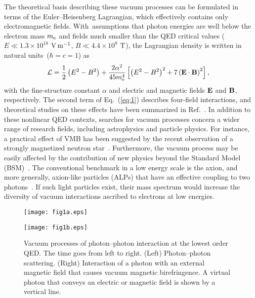 \documentclass[10pt,a4paper]{article}%
\begin{document}
The theoretical basis describing these vacuum processes can be formulated in terms of the Euler--Heisenberg Lagrangian, which effectively contains only electromagnetic fields.
With~assumptions that photon energies are well below the electron mass $m_{{\rm e}}$ and fields much smaller than the QED critical values ($E \ll 1.3 \times 10^{18}$ ${\rm V\, m^{-1}}$, $B \ll 4.4 \times 10^{9}$ ${\rm T}$), the Lagrangian density is written in natural units~($\hbar = c = 1$) as~\cite{eh}
\begin{equation}
\mathcal{L} = \frac{1}{2} \left( E^{2} - B^{2} \right) + \frac{2\alpha^{2}}{45m_{\rm{e}}^{4}} \left[ \left( E^{2} - B^{2} \right) ^{2} + 7 \left( \bf{E \cdot B} \right) ^{2} \right],
\label{eq:1}
\end{equation}
with the fine-structure constant $\alpha$ and electric and magnetic fields $\bf{E}$ and $\bf{B}$, respectively.
The second term of Eq.~(\ref{eq:1}) describes four-field interactions, and theoretical studies on these effects have been summarized in Ref.~\cite{review1, review2}.
In addition to these nonlinear QED contexts, searches for vacuum processes concern a wider range of research fields, including astrophysics and particle physics.
For instance, a practical effect of VMB has been suggested by the recent observation of a strongly magnetized neutron star~\cite{neutron_star1, neutron_star2, neutron_star3}.
Furthermore, the vacuum process may be easily affected by the contribution of new physics beyond the Standard Model (BSM)~\cite{snow_mass}.
The conventional benchmark in a low energy scale is the axion, and more generally, axion-like particles (ALPs) that have an effective coupling to two photons~\cite{axion_review}.
If such light particles exist, their mass spectrum would increase the diversity of vacuum interactions ascribed to electrons at low energies.

\begin{figure}[!t]
\begin{minipage}{0.5\hsize}
\centering
\texttt{[image: fig1a.eps]}
\end{minipage}
\begin{minipage}{0.5\hsize}
\centering
\texttt{[image: fig1b.eps]}
\end{minipage}
\caption{
Vacuum processes of photon--photon interaction at the lowest order QED.
The time goes from left to right.
(Left)
Photon--photon scattering.
(Right)
Interaction of a photon with an external magnetic field that causes vacuum magnetic birefringence.
A virtual photon that conveys an electric or magnetic field is shown by a vertical line.
\label{fig:vacuum}}
\end{figure}   
\end{document}
